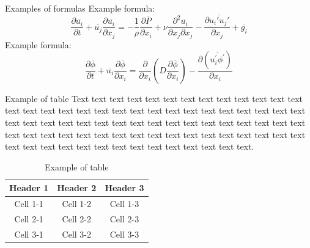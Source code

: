 \documentclass[12pt]{beamer}
\begin{document}
\begin{frame}{Examples of formulas}
  Example formula:
  \begin{equation}
      \frac{\partial \overline{u_{i}} }{\partial t} + \overline{u_{j}} \frac{\partial \overline{u_{i}} }{\partial x_{j}} = -\frac{1}{\rho}\frac{\partial \overline{P}}{\partial x_{i}}+\nu\frac{\partial ^2\overline{u_{i}}}{\partial x_{j}\partial x_{j}}-\frac{\partial \overline{u_{i}'u_{j}'}}{\partial x_{j}}+\overline{g_{i}}
  \end{equation}
    Example formula:
  \begin{equation}
     \frac{\partial \overline{\phi}}{\partial t}+\overline{u_{i}}\frac{\partial \overline{\phi}}{\partial x_{i}}=\frac{\partial}{\partial x_{i}}(D\frac{\partial \overline{\phi}}{\partial x_{i}})-\frac{\partial (\overline{{u_{i}^{'}\phi^{'}}})}{\partial x_{i}}
  \end{equation}
\end{frame}

\begin{frame}{Example of table}
    Text text text text text text text text text text text text text text text text text text text text text text text text text text text text text text text text text text text text text text text text text text text text text text text text text text text text text text text text text text text text text text text text text text text text text text text text text text text text text text.
	\begin{table}
    	  \centering
        \caption{Example of table}
    	  \begin{tabular}{|c|c|c|}
    		\hline
    		\textbf{Header 1} & \textbf{Header 2} & \textbf{Header 3} \\
    		\hline
    		Cell 1-1 & Cell 1-2 & Cell 1-3 \\
    		\hline
    		Cell 2-1 & Cell 2-2 & Cell 2-3 \\
    		\hline
    		Cell 3-1 & Cell 3-2 & Cell 3-3 \\
    		\hline
    	  \end{tabular}
	\end{table}
\end{frame}
\end{document}
